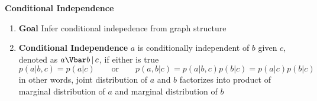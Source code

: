 \documentclass[11pt]{article}
\begin{document}


\begin{defn*}
    \textbf{Conditional Independence}
    \begin{enumerate}
        \item \textbf{Goal} Infer conditional indepedence from graph structure 
        \item \textbf{Conditional Independence} $a$ is conditionally independent of $b$ given $c$, denoted as $\condi{a}{b}{c}$, if either is true 
        \[
            p(a|b,c) = p(a|c)
            \qquad \text{or} \qquad 
            p(a,b|c) = p(a|b,c)p(b|c) = p(a|c)p(b|c)
        \]
        in other words, joint distribution of $a$ and $b$ factorizes into product of marginal distribution of $a$ and marginal distribution of $b$ 
    \end{enumerate}
\end{defn*}
\end{document}

